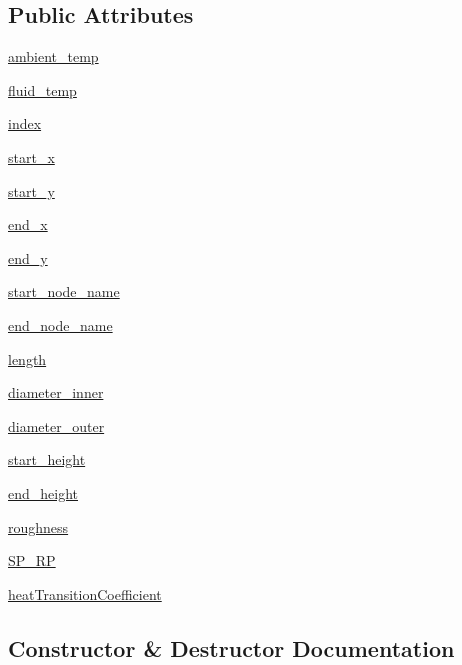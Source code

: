 \subsection*{Public Attributes}
\begin{DoxyCompactItemize}
\item 
\hyperlink{class_pipe_1_1_pipe_a721626d39e9fa569ff1bea20d43d6891}{ambient\+\_\+temp}
\item 
\hyperlink{class_pipe_1_1_pipe_a9ac4eaff0763b3dffd827858c02166bd}{fluid\+\_\+temp}
\item 
\hyperlink{class_pipe_1_1_pipe_a1fb5c94ac5e6dac7b415a170524a75f5}{index}
\item 
\hyperlink{class_pipe_1_1_pipe_a99b713a0d71ea921e5fdd7665a294598}{start\+\_\+x}
\item 
\hyperlink{class_pipe_1_1_pipe_a9104dacc2e9f3541a8171c7d7bbf8a2e}{start\+\_\+y}
\item 
\hyperlink{class_pipe_1_1_pipe_a3c89ac40d76fd166fb08ebb585ef220e}{end\+\_\+x}
\item 
\hyperlink{class_pipe_1_1_pipe_a8ea1c50334527d53a3c83b26f2c41dfa}{end\+\_\+y}
\item 
\hyperlink{class_pipe_1_1_pipe_ad604bcf622bea20a2e6089515e793700}{start\+\_\+node\+\_\+name}
\item 
\hyperlink{class_pipe_1_1_pipe_ae09a8821336f622e4215d22bdead0952}{end\+\_\+node\+\_\+name}
\item 
\hyperlink{class_pipe_1_1_pipe_aed39cdfd26dab2d8aa176fbcc8ee0eac}{length}
\item 
\hyperlink{class_pipe_1_1_pipe_a498f8ef080ca2ef5533d4bb239c02e84}{diameter\+\_\+inner}
\item 
\hyperlink{class_pipe_1_1_pipe_ad4a6c940a7986e70a34f4d7dc5659a19}{diameter\+\_\+outer}
\item 
\hyperlink{class_pipe_1_1_pipe_acdfc6a6bdd70105a3342553a03ad9277}{start\+\_\+height}
\item 
\hyperlink{class_pipe_1_1_pipe_a8c66a7b6c464b5c48d567c19be7e72ca}{end\+\_\+height}
\item 
\hyperlink{class_pipe_1_1_pipe_ae5cec5540b37294ed43fad9d9f187d4b}{roughness}
\item 
\hyperlink{class_pipe_1_1_pipe_a94e84282ca30ec24343eb219f67e783b}{S\+P\+\_\+\+RP}
\item 
\hyperlink{class_pipe_1_1_pipe_ad75af1651b56fe12e4cff8d1254afa98}{heat\+Transition\+Coefficient}
\end{DoxyCompactItemize}


\subsection{Constructor \& Destructor Documentation}
\mbox{\label{class_pipe_1_1_pipe_af59d40a027d25c62e41d11a08f14729f}} 
